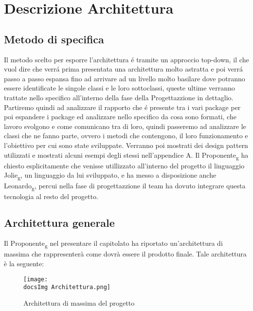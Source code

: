 \section{Descrizione Architettura}{
	
	\subsection{Metodo di specifica}{
	
	    Il metodo scelto per esporre l'architettura é tramite un approccio top-down, il che vuol dire che verrá prima presentata una architettura molto astratta e poi verrá passo a passo espansa fino ad arrivare 
	    ad un livello molto basilare dove potranno essere identificate le singole classi e le loro sottoclassi, queste ultime verranno trattate nello specifico all'interno della fase della Progettazzione in dettaglio. 
	    Partiremo quindi ad analizzare il rapporto che é presente tra i vari package per poi espandere i package ed analizzare nello specifico da cosa sono formati, che lavoro svolgono e come comunicano tra di loro,
	    quindi passeremo ad analizzare le classi che ne fanno parte, ovvero i metodi che contengono, il loro funzionamento e l'obiettivo per cui sono state sviluppate. Verranno poi mostrati dei design pattern utilizzati
	    e mostrati alcuni esempi degli stessi nell'appendice A.	Il Proponente\textsubscript{g} ha chiesto esplicitamente che venisse utillizzato all'interno del progetto il linguaggio Jolie\textsubscript{g}, un linguaggio da lui sviluppato,
	    e ha messo a disposizione anche Leonardo\textsubscript{g}, percui nella fase di progettazzione il team ha dovuto integrare questa tecnologia al resto del progetto.
		
	}
	\subsection{Architettura generale}{
		Il Proponente\textsubscript{g} nel presentare il capitolato ha riportato un'architettura di massima che rappresenterà come dovrà essere il prodotto finale. Tale architettura è la seguente:
	
		\begin{figure}[ht]
			\centering
			\texttt{[image: \\docsImg Architettura.png]}
			\caption{Architettura di massima del progetto}
			\label{Architettura di massima del progetto}
		\end{figure}
		
}}
